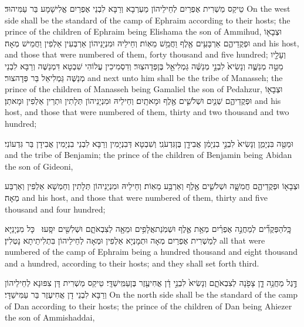 {טֵיקַס מַשְׁרִית אֶפְרַיִם לְחֵילֵיהוֹן מַעְרְבָא וְרַבָּא לִבְנֵי אֶפְרַיִם אֱלִישָׁמָע בַּר עַמִּיהוּד׃}
{On the west side shall be the standard of the camp of Ephraim according to their hosts; the prince of the children of Ephraim being Elishama the son of Ammihud,}{}
{וּצְבָא֖וֹ וּפְקֻדֵיהֶ֑ם אַרְבָּעִ֥ים אֶ֖לֶף וַחֲמֵ֥שׁ מֵאֽוֹת׃}
{וְחֵילֵיהּ וּמִנְיָנֵיהוֹן אַרְבְּעִין אַלְפִין וַחֲמֵישׁ מְאָה׃}
{and his host, and those that were numbered of them, forty thousand and five hundred;}{}
{וְעָלָ֖יו מַטֵּ֣ה מְנַשֶּׁ֑ה וְנָשִׂיא֙ לִבְנֵ֣י מְנַשֶּׁ֔ה גַּמְלִיאֵ֖ל בֶּן\maqqaf פְּדָהצֽוּר׃}
{וְדִסְמִיכִין עֲלוֹהִי שִׁבְטָא דִּמְנַשֶּׁה וְרַבָּא לִבְנֵי מְנַשֶּׁה גַּמְלִיאֵל בַּר פְּדָהצוּר׃}
{and next unto him shall be the tribe of Manasseh; the prince of the children of Manasseh being Gamaliel the son of Pedahzur,}{}
{וּצְבָא֖וֹ וּפְקֻדֵיהֶ֑ם שְׁנַ֧יִם וּשְׁלֹשִׁ֛ים אֶ֖לֶף וּמָאתָֽיִם׃}
{וְחֵילֵיהּ וּמִנְיָנֵיהוֹן תְּלָתִין וּתְרֵין אַלְפִין וּמָאתַן׃}
{and his host, and those that were numbered of them, thirty and two thousand and two hundred;}{}

{וּמַטֵּ֖ה בִּנְיָמִ֑ן וְנָשִׂיא֙ לִבְנֵ֣י בִנְיָמִ֔ן אֲבִידָ֖ן בֶּן\maqqaf גִּדְעֹנִֽי׃}
{וְשִׁבְטָא דְּבִנְיָמִין וְרַבָּא לִבְנֵי בִנְיָמִין אֲבִידָן בַּר גִּדְעוֹנִי׃}
{and the tribe of Benjamin; the prince of the children of Benjamin being Abidan the son of Gideoni,}{}

{וּצְבָא֖וֹ וּפְקֻדֵיהֶ֑ם חֲמִשָּׁ֧ה וּשְׁלֹשִׁ֛ים אֶ֖לֶף וְאַרְבַּ֥ע מֵאֽוֹת׃}
{וְחֵילֵיהּ וּמִנְיָנֵיהוֹן תְּלָתִין וְחַמְשָׁא אַלְפִין וְאַרְבַּע מְאָה׃}
{and his host, and those that were numbered of them, thirty and five thousand and four hundred;}{}

{כׇּֽל\maqqaf הַפְּקֻדִ֞ים לְמַחֲנֵ֣ה אֶפְרַ֗יִם מְאַ֥ת אֶ֛לֶף וּשְׁמֹֽנַת\maqqaf אֲלָפִ֥ים וּמֵאָ֖ה לְצִבְאֹתָ֑ם וּשְׁלִשִׁ֖ים יִסָּֽעוּ׃ \setuma }
{כָּל מִנְיָנַיָּא לְמַשְׁרִית אֶפְרַיִם מְאָה וּתְמָנְיָא אַלְפִין וּמְאָה לְחֵילֵיהוֹן בִּתְלִיתֵיתָא נָטְלִין׃}
{all that were numbered of the camp of Ephraim being a hundred thousand and eight thousand and a hundred, according to their hosts; and they shall set forth third.}{}

{דֶּ֣גֶל מַחֲנֵ֥ה דָ֛ן צָפֹ֖נָה לְצִבְאֹתָ֑ם וְנָשִׂיא֙ לִבְנֵ֣י דָ֔ן אֲחִיעֶ֖זֶר בֶּן\maqqaf עַמִּֽישַׁדָּֽי׃}
{טֵיקַס מַשְׁרִית דָּן צִפּוּנָא לְחֵילֵיהוֹן וְרַבָּא לִבְנֵי דָן אֲחִיעֶזֶר בַּר עַמִּישַׁדָּי׃}
{On the north side shall be the standard of the camp of Dan according to their hosts; the prince of the children of Dan being Ahiezer the son of Ammishaddai,}{}

